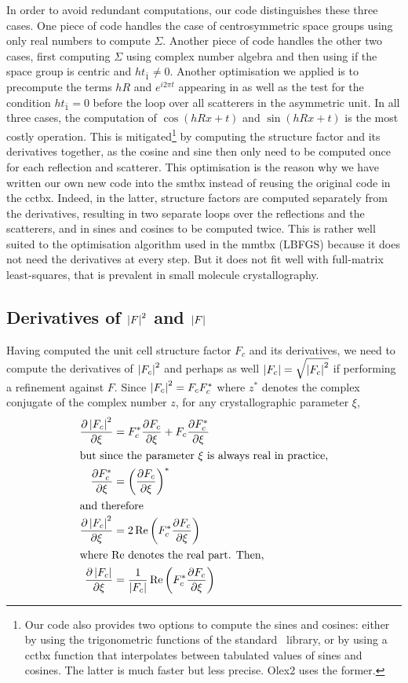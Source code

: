 \documentclass[pdf]{iucr}
\begin{document}
In order to avoid redundant computations, our code distinguishes these three cases. One piece of code handles the case of centrosymmetric space groups using only real numbers to compute $\Sigma$. Another piece of code handles the other two cases, first computing $\Sigma$ using complex number algebra and then using  if the space group is centric and $h t_{\bar{1}} \neq 0$. Another optimisation we applied is to precompute the terms $hR$ and $e^{i2\pi t}$ appearing in  as well as the test for the condition $h t_{\bar{1}}=0$ before the loop over all scatterers in the asymmetric unit. In all three cases, the computation of $\cos(hRx + t)$ and $\sin(hRx + t)$ is the most costly operation. This is mitigated\footnote{Our code also provides two options to compute the sines and cosines: either by using the trigonometric functions of the standard \cpp\ library, or by using a cctbx function that interpolates between tabulated values of sines and cosines. The latter is much faster but less precise. Olex2 uses the former.} by computing the structure factor and its derivatives together, as the cosine and sine then only need to be computed once for each reflection and scatterer.
This optimisation is the reason why we have written our own new code into the smtbx instead of reusing the original code in the cctbx. Indeed, in the latter, structure factors are computed separately from the derivatives, resulting in two separate loops over the reflections and the scatterers, and in sines and cosines to be computed twice. This is rather well suited to the optimisation algorithm used in the mmtbx (LBFGS) because it does not need the derivatives at every step. But it does not fit well with full-matrix least-squares, that is prevalent in small molecule crystallography.  

\subsection{Derivatives of $\left| F \right|^2$ and $\left| F \right|$}

Having computed the unit cell structure factor $F_c$ and its derivatives, we need to compute the derivatives of $\left| F_c \right|^2$ and perhaps as well $\left| F_c \right| = \sqrt{\left| F_c \right|^2}$ if performing a refinement against $F$. Since $\left| F_c \right|^2 = F_c F_c^*$ where $z^*$ denotes the complex conjugate of the complex number $z$, for any crystallographic parameter $\xi$,
\begin{align}
\frac{\partial \left| F_c \right|^2}{\partial \xi} &= F_c^* \frac{\partial F_c}{\partial \xi} + F_c \frac{\partial F_c^*}{\partial \xi} \nonumber \\
\intertext{but since the parameter $\xi$ is always real in practice,}
\frac{\partial F_c^*}{\partial \xi} &= \left( \frac{\partial F_c}{\partial \xi} \right)^* \\
\intertext{and therefore}
\frac{\partial \left| F_c \right|^2}{\partial \xi} &= 2\operatorname{Re}\left( F_c^* \frac{\partial F_c}{\partial \xi}\right) \\
\intertext{where $\operatorname{Re}$ denotes the real part. Then,}
\frac{\partial \left| F_c \right|}{\partial \xi} &= \frac{1}{\left| F_c \right|} \operatorname{Re}\left( F_c^* \frac{\partial F_c}{\partial \xi}\right)
\end{align}
\end{document}
